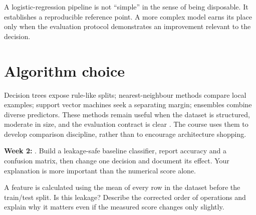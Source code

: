 A logistic-regression pipeline is not ``simple'' in the sense of being disposable. It establishes a reproducible reference point. A more complex model earns its place only when the evaluation protocol demonstrates an improvement relevant to the decision.

\section{Algorithm choice}
Decision trees expose rule-like splits; nearest-neighbour methods compare local examples; support vector machines seek a separating margin; ensembles combine diverse predictors. These methods remain useful when the dataset is structured, moderate in size, and the evaluation contract is clear \citep{vapnik1995,breiman2001}. The course uses them to develop comparison discipline, rather than to encourage architecture shopping.

\begin{labbox}
\textbf{Week 2:} . Build a leakage-safe baseline classifier, report accuracy and a confusion matrix, then change one decision and document its effect. Your explanation is more important than the numerical score alone.
\end{labbox}

\begin{checkpointbox}
A feature is calculated using the mean of every row in the dataset before the train/test split. Is this leakage? Describe the corrected order of operations and explain why it matters even if the measured score changes only slightly.
\end{checkpointbox}
